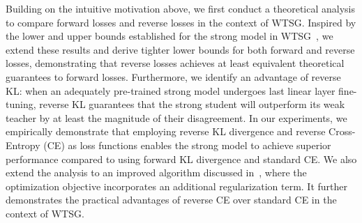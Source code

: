 Building on the intuitive motivation above, we first conduct a theoretical analysis to compare forward losses and reverse losses in the context of WTSG. 
Inspired by the lower and upper bounds established for the strong model in WTSG~\citep{yao2025understanding}, we extend these results and derive tighter lower bounds for both forward and reverse losses, demonstrating that reverse losses achieves at least equivalent theoretical guarantees to forward losses.
Furthermore, we identify an advantage of reverse KL: when an adequately pre-trained strong model undergoes last linear layer fine-tuning, reverse KL guarantees that the strong student will outperform its weak teacher by at least the magnitude of their disagreement.
In our experiments, we empirically demonstrate that employing reverse KL divergence and reverse Cross-Entropy (CE) as loss functions enables the strong model to achieve superior performance compared to using forward KL divergence and standard CE.
We also extend the analysis to an improved algorithm discussed in~\citet{burns2023weak}, where the optimization objective incorporates an additional regularization term. It further demonstrates the practical advantages of reverse CE over standard CE in the context of WTSG.








